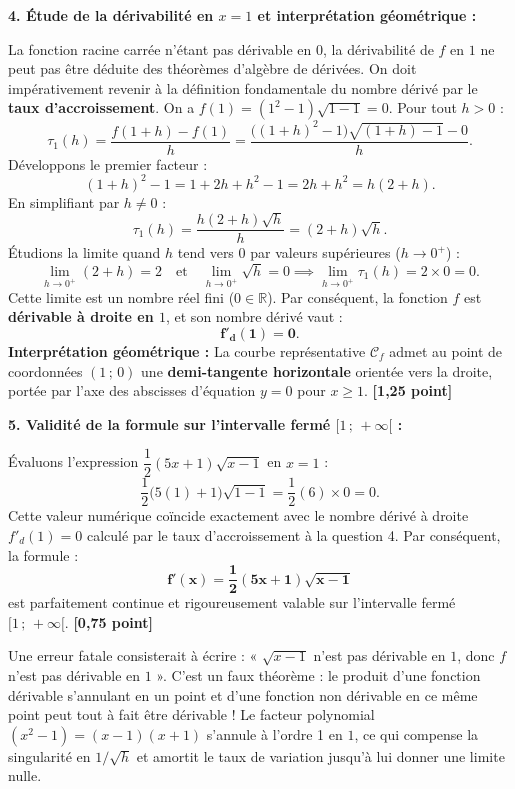 \documentclass[11pt,a4paper]{article}
\newcommand{\R}{\mathbb{R}}
\begin{document}
\begin{correctionbox}
\medskip
\textbf{4. Étude de la dérivabilité en $x = 1$ et interprétation géométrique :}

La fonction racine carrée n'étant pas dérivable en $0$, la dérivabilité de $f$ en $1$ ne peut pas être déduite des théorèmes d'algèbre de dérivées. On doit impérativement revenir à la définition fondamentale du nombre dérivé par le \textbf{taux d'accroissement}.
On a $f(1) = (1^2 - 1)\sqrt{1 - 1} = 0$. Pour tout $h > 0$ :
\[
\tau_1(h) = \frac{f(1 + h) - f(1)}{h} = \frac{\bigl((1 + h)^2 - 1\bigr)\sqrt{(1 + h) - 1} - 0}{h}.
\]
Développons le premier facteur :
\[
(1 + h)^2 - 1 = 1 + 2h + h^2 - 1 = 2h + h^2 = h(2 + h).
\]
En simplifiant par $h \neq 0$ :
\[
\tau_1(h) = \frac{h(2 + h)\sqrt{h}}{h} = (2 + h)\sqrt{h}.
\]
Étudions la limite quand $h$ tend vers $0$ par valeurs supérieures ($h \to 0^+$) :
\[
\lim_{h \to 0^+} (2 + h) = 2 \quad \text{et} \quad \lim_{h \to 0^+} \sqrt{h} = 0 \implies \lim_{h \to 0^+} \tau_1(h) = 2 \times 0 = 0.
\]
Cette limite est un nombre réel fini ($0 \in \R$). Par conséquent, la fonction $f$ est \textbf{dérivable à droite en $1$}, et son nombre dérivé vaut :
\[
\mathbf{f'_d(1) = 0}.
\]
\textbf{Interprétation géométrique :} La courbe représentative $\mathcal{C}_f$ admet au point de coordonnées $(1\,;\,0)$ une \textbf{demi-tangente horizontale} orientée vers la droite, portée par l'axe des abscisses d'équation $y = 0$ pour $x \ge 1$. \hfill \textbf{[1{,}25 point]}

\medskip
\textbf{5. Validité de la formule sur l'intervalle fermé $[1\,;\,+\infty[$ :}

Évaluons l'expression $\dfrac{1}{2}(5x + 1)\sqrt{x - 1}$ en $x = 1$ :
\[
\frac{1}{2}\bigl(5(1) + 1\bigr)\sqrt{1 - 1} = \frac{1}{2}(6) \times 0 = 0.
\]
Cette valeur numérique coïncide exactement avec le nombre dérivé à droite $f'_d(1) = 0$ calculé par le taux d'accroissement à la question 4.
Par conséquent, la formule :
\[
\mathbf{f'(x) = \frac{1}{2}(5x + 1)\sqrt{x - 1}}
\]
est parfaitement continue et rigoureusement valable sur l'intervalle fermé $[1\,;\,+\infty[$. \hfill \textbf{[0{,}75 point]}
\end{correctionbox}

\begin{alertebox}
Une erreur fatale consisterait à écrire : « $\sqrt{x-1}$ n'est pas dérivable en $1$, donc $f$ n'est pas dérivable en $1$ ».
C'est un faux théorème : le produit d'une fonction dérivable s'annulant en un point et d'une fonction non dérivable en ce même point peut tout à fait être dérivable ! Le facteur polynomial $(x^2 - 1) = (x-1)(x+1)$ s'annule à l'ordre 1 en $1$, ce qui compense la singularité en $1/\sqrt{h}$ et amortit le taux de variation jusqu'à lui donner une limite nulle.
\end{alertebox}
\end{document}

